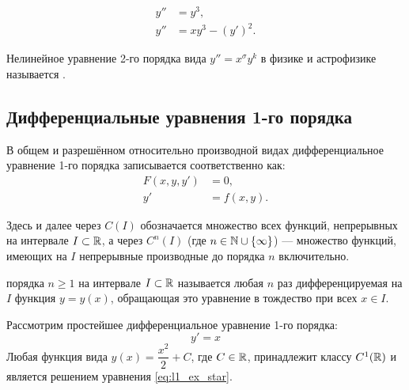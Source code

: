 \begin{example} ~
    \begin{align*}
        y'' &= y^3, \\
        y'' &= x y^3 - (y')^2.
    \end{align*}
\end{example}

\begin{remark}
    Нелинейное уравнение 2-го порядка вида $y'' = x^\sigma y^k$ в физике и
    астрофизике называется .
\end{remark}

\subsection{Дифференциальные уравнения 1-го порядка}

В общем и разрешённом относительно производной видах дифференциальное
уравнение 1-го порядка записывается соответственно как:
\begin{align}
    F(x, y, y') &= 0, \tag{3} \label{eq:l1_ode1_imp} \\
    y' &= f(x, y). \tag{4} \label{eq:l1_ode1_exp}
\end{align}

\begin{designation}
    Здесь и далее через $C(I)$ обозначается множество всех функций,
    непрерывных на интервале $I \subset \mathbb{R}$, а через $C^n(I)$ (где
    $n \in \mathbb{N} \cup \{\infty\}$) — множество функций, имеющих на $I$
    непрерывные производные до порядка $n$ включительно.
\end{designation}

\begin{definition}
     порядка $n \ge 1$ на
    интервале $I \subset \mathbb{R}$ называется любая $n$ раз дифференцируемая на $I$
    функция $y = y(x)$, обращающая это уравнение в тождество при всех
    $x \in I$.
\end{definition}

\begin{example}
    Рассмотрим простейшее дифференциальное уравнение 1-го порядка:
    \begin{equation} \label{eq:l1_ex_star}
        y' = x \tag{5}
    \end{equation}
    Любая функция вида $y(x) = \dfrac{x^2}{2} + C$, где $C \in \mathbb{R}$, принадлежит
    классу $C^1(\mathbb{R})$ и является решением уравнения \eqref{eq:l1_ex_star}.
\end{example}

